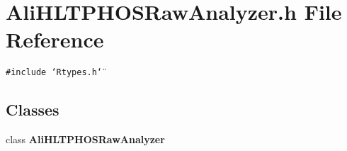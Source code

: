 \section{Ali\-HLTPHOSRaw\-Analyzer.h File Reference}
\label{AliHLTPHOSRawAnalyzer_8h}


{\tt \#include \char`\"{}Rtypes.h\char`\"{}}\par
\subsection*{Classes}
\begin{CompactItemize}
\item 
class {\bf Ali\-HLTPHOSRaw\-Analyzer}
\end{CompactItemize}
